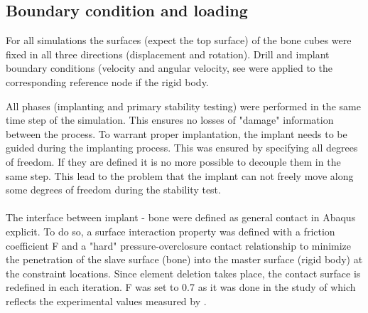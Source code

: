 \documentclass[12pt, a4paper, twoside]{report}
\begin{document}
\subsection{Boundary condition and loading}
%
%
For all simulations the surfaces (expect the top surface) of the bone cubes were fixed in all three directions (displacement and rotation). Drill and implant boundary conditions (velocity and angular velocity, see were applied to the corresponding reference node if the rigid body.
%
\begin{table}[H]
\caption{Boundary conditions of implanting and primary stability test of G1, G2 and G3.}
\label{tab:drillprotocolsGNS}
\end{table}
%
All phases (implanting and primary stability testing) were performed in the same time step of the simulation. This ensures no losses of "damage" information between the process. To warrant proper implantation, the implant needs to be guided during the implanting process. This was ensured by specifying all degrees of freedom. If they are defined it is no more possible to decouple them in the same step. This lead to the problem that the implant can not freely move along some degrees of freedom during the stability test.\\
%
\\
The interface between implant - bone were defined as general contact in Abaqus explicit. To do so, a surface interaction property was defined with a friction coefficient F and a "hard" pressure-overclosure contact relationship to minimize the penetration of the slave surface (bone) into the master surface (rigid body) at the constraint locations. Since element deletion takes place, the contact surface is redefined in each iteration. F was set to 0.7 as it was done in the study of \cite{Ovesy_2019_JMechBehavBiomedMater} which 
reflects the experimental values measured by \cite{Voutat_2019_Biotribology}.
%
%
\end{document}

